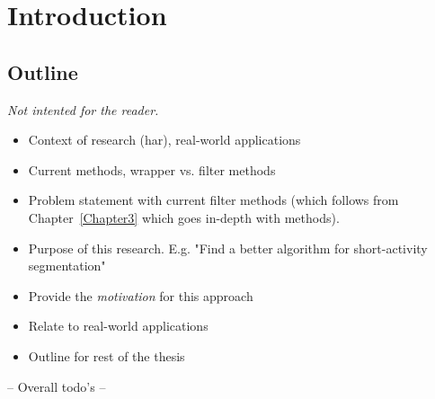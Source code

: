 
\chapter{Introduction}

\label{Chapter1} %



\section{Outline}
\emph{Not intented for the reader.}
\begin{itemize}
  \item Context of research (\gls{har}), real-world applications
  \item Current methods, wrapper vs. filter methods
  \item Problem statement with current filter methods (which follows from Chapter~\ref{Chapter3} which goes in-depth with methods).
  \item Purpose of this research. E.g. "Find a better algorithm for short-activity segmentation"
  \item Provide the \emph{motivation} for this approach
  \item Relate to real-world applications
  \item Outline for rest of the thesis
\end{itemize}

-- Overall todo's --
